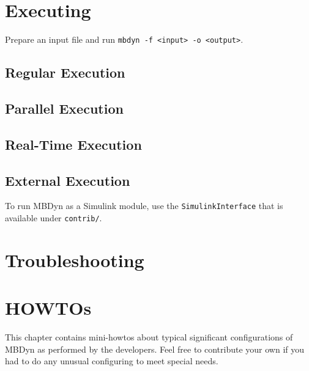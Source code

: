 \documentclass[10pt,dvips]{report}
\newcommand{\kw}[1]{\texttt{#1}}
\begin{document}
\chapter{Executing}
Prepare an input file and run \kw{mbdyn -f <input> -o <output>}.

\section{Regular Execution}

\section{Parallel Execution}

\section{Real-Time Execution}

\section{External Execution}
To run MBDyn as a Simulink module, use the \kw{SimulinkInterface}
that is available under \kw{contrib/}.

\chapter{Troubleshooting}

\chapter{HOWTOs}
This chapter contains mini-howtos about typical significant 
configurations of MBDyn as performed by the developers.
Feel free to contribute your own if you had to do any unusual
configuring to meet special needs.
\end{document}
